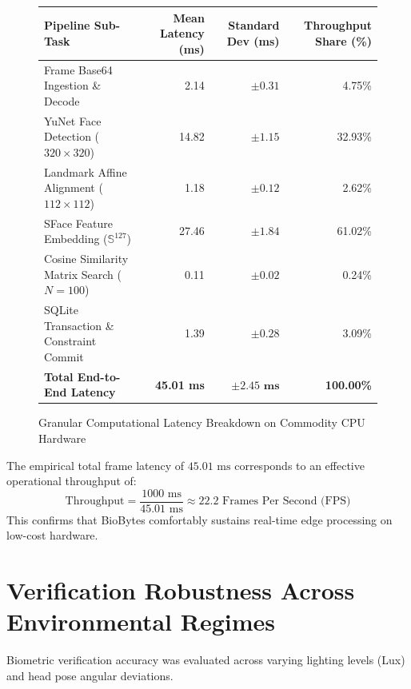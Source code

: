 \documentclass[12pt,a4paper,oneside]{report}
\begin{document}
\begin{figure}[htbp]
\centering
\small
\renewcommand{\arraystretch}{1.2}
\begin{tabular}{|l|r|r|r|}
\hline
\textbf{Pipeline Sub-Task} & \textbf{Mean Latency (ms)} & \textbf{Standard Dev (ms)} & \textbf{Throughput Share (\%)} \\
\hline
Frame Base64 Ingestion \& Decode & 2.14 & $\pm 0.31$ & 4.75\% \\
YuNet Face Detection ($320 \times 320$) & 14.82 & $\pm 1.15$ & 32.93\% \\
Landmark Affine Alignment ($112 \times 112$) & 1.18 & $\pm 0.12$ & 2.62\% \\
SFace Feature Embedding ($\mathbb{S}^{127}$) & 27.46 & $\pm 1.84$ & 61.02\% \\
Cosine Similarity Matrix Search ($N=100$) & 0.11 & $\pm 0.02$ & 0.24\% \\
SQLite Transaction \& Constraint Commit & 1.39 & $\pm 0.28$ & 3.09\% \\
\hline
\textbf{Total End-to-End Latency} & \textbf{45.01 ms} & $\mathbf{\pm 2.45\text{ ms}}$ & \textbf{100.00\%} \\
\hline
\end{tabular}
\caption{Granular Computational Latency Breakdown on Commodity CPU Hardware}
\label{fig:latency_table_consolidated}
\end{figure}

The empirical total frame latency of $45.01\text{ ms}$ corresponds to an effective operational throughput of:
\begin{equation}
\text{Throughput} = \frac{1000\text{ ms}}{45.01\text{ ms}} \approx 22.2\text{ Frames Per Second (FPS)}
\end{equation}
This confirms that BioBytes comfortably sustains real-time edge processing on low-cost hardware.

\section{Verification Robustness Across Environmental Regimes}
Biometric verification accuracy was evaluated across varying lighting levels (Lux) and head pose angular deviations.
\end{document}
